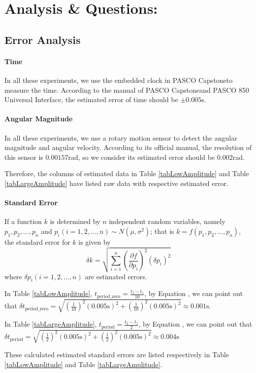 \section{Analysis \& Questions:}
\subsection{Error Analysis}
\paragraph{Time}
In all these experiments, we use the embedded clock in PASCO Capstone\texttrademark to measure the time. According to the manual of PASCO Capstone\texttrademark and PASCO 850 Universal Interface, the estimated error of time should be $\pm0.005$s.
\paragraph{Angular Magnitude}
In all these experiments, we use a rotary motion sensor to detect the angular magnitude and angular velocity. According to its official manual, the resolution of this sensor is $0.00157$rad, so we consider its estimated error should be $0.002$rad.\par
Therefore, the columns of estimated data in Table \ref{tabLowAmplitude} and Table \ref{tabLargeAmplitude} have listed raw data with respective estimated error.
\paragraph{Standard Error}
If a function $k$ is determined by $n$ independent random variables, namely $p_1, p_2, ..., p_n$ and $p_i (i=1, 2, ..., n)\sim N(\mu,\sigma^2)$; that is $k=f(p_1, p_2, ..., p_n)$, the standard error for $k$ is given by
\begin{equation}\label{eq:stdErr}
  \delta k=\sqrt{\sum_{i=1}^{n}(\frac{\partial f}{\partial p_i})^2(\delta p_i)^2}
\end{equation}
where $\delta p_i (i=1, 2, ..., n)$ are estimated errors.\par
In Table \ref{tabLowAmplitude}, $t_{\text{period_zero}}=\frac{t_2-t_1}{10}$, by Equation , we can point out that $\delta t_{\text{period_zero}}=\sqrt{(\frac{1}{10})^2(0.005 \text{s})^2+(\frac{1}{10})^2(0.005\text{s})^2}\approx0.001\text{s}$.\par
In Table \ref{tabLargeAmplitude}, $t_{\text{period}}=\frac{t_2-t_1}{2}$, by Equation , we can point out that \linebreak $\delta t_{\text{period}}=\sqrt{(\frac{1}{2})^2(0.005\text{s})^2+(\frac{1}{2})^2(0.005\text{s})^2}\approx0.004\text{s}$\par
These calculated estimated standard errors are listed respectively in Table \ref{tabLowAmplitude} and Table \ref{tabLargeAmplitude}.
